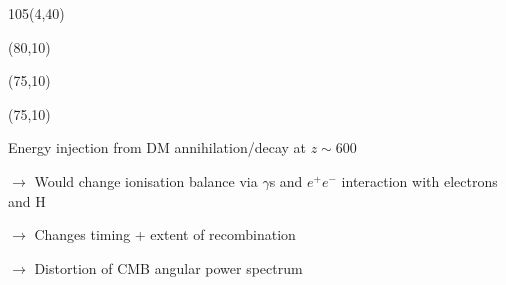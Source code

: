 \documentclass[xcolor=dvipsnames]{beamer}
\begin{document}
\begin{frame}
\begin{textblock}{105}(4,40)
\end{textblock}

\begin{textblock}{40}(80,10)
\color[rgb]{0, 0, 0}
\end{textblock}

\begin{textblock}{40}(75,10)
\color[rgb]{0, 0, 0}
\end{textblock}

\begin{textblock}{40}(75,10)
\color[rgb]{0, 0, 0}
\end{textblock}

\end{frame}



Energy injection from DM annihilation/decay at $z\sim600$
\bi
\item[$\rightarrow$] Would change ionisation balance via $\gamma$s and $e^+e^-$ interaction with electrons and H
\item[$\rightarrow$] Changes timing + extent of recombination
\item[$\rightarrow$] Distortion of CMB angular power spectrum
\ei
\vspace{4cm}
\end{document}
